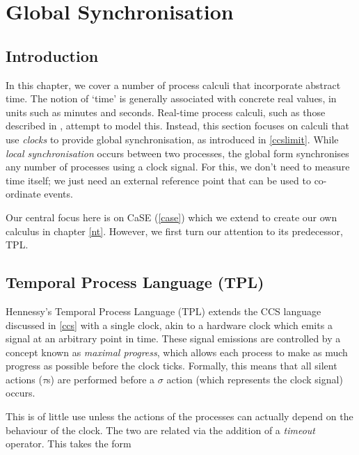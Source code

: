 
\chapter{Global Synchronisation}
\label{globsync}

\section{Introduction}
\label{timing}

In this chapter, we cover a number of process calculi that incorporate
abstract time.  The notion of `time' is generally associated with
concrete real values, in units such as minutes and seconds.  Real-time
process calculi, such as those described in
\cite{tccs,satoh:distrib,aceto:timing,satoh:phd,beaten:timing,lee:realtime,brics:lee},
attempt to model this.  Instead, this section focuses on calculi that
use \emph{clocks} to provide global synchronisation, as introduced in
\ref{ccslimit}.  While \emph{local synchronisation} occurs between two
processes, the global form synchronises any number of processes using
a clock signal.  For this, we don't need to measure time itself; we
just need an external reference point that can be used to co-ordinate
events.

Our central focus here is on CaSE (\ref{case}) which we extend to
create our own calculus in chapter \ref{nt}.  However, we first turn
our attention to its predecessor, TPL.

\section{Temporal Process Language (TPL)}
\label{tpl}

Hennessy's Temporal Process Language (TPL) \cite*{hennessy:tpl} extends
the CCS language discussed in \ref{ccs} with a single clock, akin to a
hardware clock which emits a signal at an arbitrary point in time.
These signal emissions are controlled by a concept known as
\emph{maximal progress}, which allows each process to make as much
progress as possible before the clock ticks.  Formally, this means
that all silent actions ($\tau$s) are performed before a $\sigma$
action (which represents the clock signal) occurs.

This is of little use unless the actions of the processes can actually
depend on the behaviour of the clock.  The two are related via the
addition of a \emph{timeout} operator.  This takes the form


